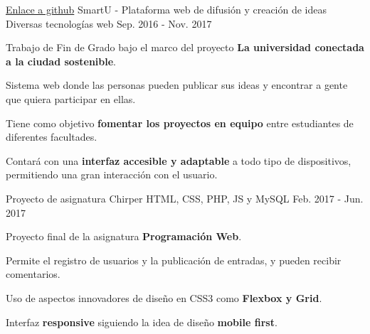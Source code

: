 

\begin{cventries}

  \cventry
    {\href{https://www.github.com}{Enlace a github}} %
    {SmartU - Plataforma web de difusión y creación de ideas} %
    {Diversas tecnologías web} %
    {Sep. 2016 - Nov. 2017} %
    {
      \begin{cvitems} %
        \item {Trabajo de Fin de Grado bajo el marco del proyecto \textbf{La universidad conectada a la ciudad sostenible}.}
        \item {Sistema web donde las personas pueden publicar sus ideas y encontrar a gente que quiera participar en ellas.}
        \item {Tiene como objetivo \textbf{fomentar los proyectos en equipo} entre estudiantes de diferentes facultades.}
        \item {Contará con una \textbf{interfaz accesible y adaptable} a todo tipo de dispositivos, permitiendo una gran interacción con el usuario.}
      \end{cvitems}
    }

  \cventry
    {Proyecto de asignatura} %
    {Chirper} %
    {HTML, CSS, PHP, JS y MySQL} %
    {Feb. 2017 - Jun. 2017} %
    {
      \begin{cvitems} %
        \item {Proyecto final de la asignatura \textbf{Programación Web}.}
        \item {Permite el registro de usuarios y la publicación de entradas, y pueden recibir comentarios.}
        \item {Uso de aspectos innovadores de diseño en CSS3 como \textbf{Flexbox y Grid}.}
        \item {Interfaz \textbf{responsive} siguiendo la idea de diseño \textbf{mobile first}.}
      \end{cvitems}
    }


\end{cventries}
